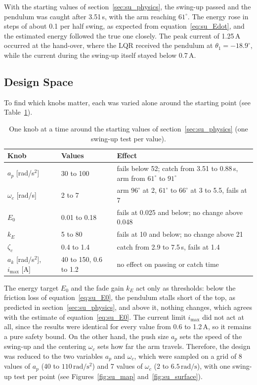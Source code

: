 \documentclass[a4paper,11pt]{article}
\begin{document}
With the starting values of section~\ref{sec:su_physics}, the swing-up passed and the pendulum was caught after 3.51\,s, with the arm reaching $61^\circ$. The energy rose in steps of about 0.1 per half swing, as expected from equation~\ref{eq:su_Edot}, and the estimated energy followed the true one closely. The peak current of 1.25\,A occurred at the hand-over, where the LQR received the pendulum at $\theta_1 = -18.9^\circ$, while the current during the swing-up itself stayed below 0.7\,A.

\subsection{Design Space}
\label{sec:su_space}
To find which knobs matter, each was varied alone around the starting point (see Table~\ref{tab:su_oat}).

\begin{table}[h]
\centering
\caption{One knob at a time around the starting values of section~\ref{sec:su_physics} (one swing-up test per value).}
\label{tab:su_oat}
\footnotesize
\begin{tabular}{@{}lll@{}}
\toprule
Knob & Values & Effect \\
\midrule
$a_p$ [rad/s$^2$] & 30 to 100 & fails below 52; catch from 3.51 to 0.88\,s, arm from $61^\circ$ to $91^\circ$ \\
$\omega_c$ [rad/s] & 2 to 7 & arm $96^\circ$ at 2, $61^\circ$ to $66^\circ$ at 3 to 5.5, fails at 7 \\
$E_0$ & 0.01 to 0.18 & fails at 0.025 and below; no change above 0.048 \\
$k_E$ & 5 to 80 & fails at 10 and below; no change above 21 \\
$\zeta_c$ & 0.4 to 1.4 & catch from 2.9 to 7.5\,s, fails at 1.4 \\
$a_k$ [rad/s$^2$], $i_{\max}$ [A] & 40 to 150, 0.6 to 1.2 & no effect on passing or catch time \\
\bottomrule
\end{tabular}
\end{table}

The energy target $E_0$ and the fade gain $k_E$ act only as thresholds: below the friction loss of equation~\ref{eq:su_E0}, the pendulum stalls short of the top, as predicted in section~\ref{sec:su_physics}, and above it, nothing changes, which agrees with the estimate of equation~\ref{eq:su_E0}. The current limit $i_{\max}$ did not act at all, since the results were identical for every value from 0.6 to 1.2\,A, so it remains a pure safety bound. On the other hand, the push size $a_p$ sets the speed of the swing-up and the centering $\omega_c$ sets how far the arm travels. Therefore, the design was reduced to the two variables $a_p$ and $\omega_c$, which were sampled on a grid of 8 values of $a_p$ (40 to $110\,\mathrm{rad/s^2}$) and 7 values of $\omega_c$ (2 to $6.5\,\mathrm{rad/s}$), with one swing-up test per point (see Figures~\ref{fig:su_map} and~\ref{fig:su_surface}).
\end{document}
